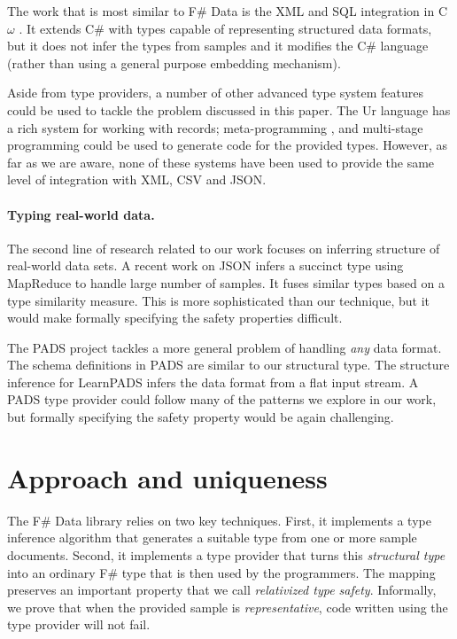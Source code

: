 \documentclass[preprint]{sigplanconf}
\begin{document}
The work that is most similar to F\# Data is the XML and SQL integration in C$\omega$ \cite{comega-xs}.
It extends C\# with types capable of representing structured data formats, but it does not infer
the types from samples and it modifies the C\# language (rather than using a general purpose
embedding mechanism).

Aside from type providers, a number of other advanced type system features could be used to
tackle the problem discussed in this paper. The Ur \cite{ur} language has a rich system for working
with records; meta-programming \cite{template-hask}, \cite{th-camlp4} and multi-stage programming
\cite{multi-stage} could be used to generate code for the provided types. However, as far as we
are aware, none of these systems have been used to provide the same level of integration with
XML, CSV and JSON.

\paragraph{Typing real-world data.}
The second line of research related to our work focuses on inferring structure of real-world data sets.
A recent work on JSON \cite{typing-json} infers a succinct type using MapReduce to handle large number
of samples. It fuses similar types based on a type similarity measure. This is more sophisticated than
our technique, but it would make formally specifying the safety properties difficult.

The PADS project \cite{pads-dsl,pads-ml} tackles a more general problem of handling \emph{any} data format.
The schema definitions in PADS are similar to our structural type. The structure inference for LearnPADS
\cite{pads-learn} infers the data format from a flat input stream. A PADS type provider could follow
many of the patterns we explore in our work, but formally specifying the safety property would be
again challenging.


\section{Approach and uniqueness}

The F\# Data library relies on two key techniques. First, it implements a type inference algorithm
that generates a suitable type from one or more sample documents. Second, it implements a type
provider that turns this \emph{structural type} into an ordinary F\# type that is then used by
the programmers. The mapping preserves an important property that we call \emph{relativized type
safety}. Informally, we prove that when the provided sample is \emph{representative}, code written
using the type provider will not fail.
\end{document}
